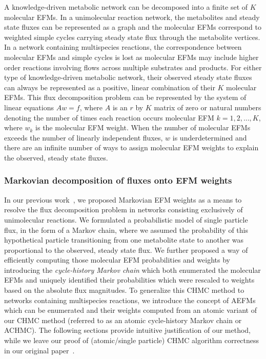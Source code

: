 \documentclass[12pt]{article}
\begin{document}
A knowledge-driven metabolic network can be decomposed into a finite set
of $K$ molecular EFMs. In a unimolecular reaction network, the metabolites
and steady state fluxes can be represented as a graph and the molecular
EFMs correspond to weighted simple cycles carrying steady state flux
through the metabolite vertices. In a network containing multispecies
reactions, the correspondence between molecular EFMs and simple cycles is
lost as molecular EFMs may include higher order reactions involving flows
across multiple substrates and products. For either type of
knowledge-driven metabolic network, their observed steady state fluxes can
always be represented as a positive, linear combination of their $K$
molecular EFMs. This flux decomposition problem can be represented by the
system of linear equations $Aw = f$, where $A$ is an $r$ by $K$ matrix of
zero or natural numbers denoting the number of times each reaction occurs
molecular EFM $k=1,2,\ldots,K$, where $w_k$ is the molecular EFM weight.
When the number of molecular EFMs exceeds the number of linearly
independent fluxes, $w$ is underdetermined and there are an infinite
number of ways to assign molecular EFM weights to explain the observed,
steady state fluxes.

\subsubsection*{Markovian decomposition of fluxes onto EFM weights} %

In our previous work~\citep{ChitpinJustinG2023AMct}, we proposed Markovian
EFM weights as a means to resolve the flux decomposition problem in
networks consisting exclusively of unimolecular reactions. We formulated
a probabilistic model of single particle flux, in the form of a Markov
chain, where we assumed the probability of this hypothetical particle
transitioning from one metabolite state to another was proportional to the
observed, steady state flux. We further proposed a way of efficiently
computing those molecular EFM probabilities and weights by introducing the
\emph{cycle-history Markov chain} which both enumerated the molecular EFMs
and uniquely identified their probabilities which were rescaled to weights
based on the absolute flux magnitudes. To generalize this CHMC method to
networks containing multispecies reactions, we introduce the concept of
AEFMs which can be enumerated and their weights computed from an atomic
variant of our CHMC method (referred to as an atomic cycle-history Markov
chain or ACHMC). The following sections provide intuitive justification of
our method, while we leave our proof of (atomic/single particle) CHMC
algorithm correctness in our original
paper~\citep{ChitpinJustinG2023AMct}.
\end{document}
